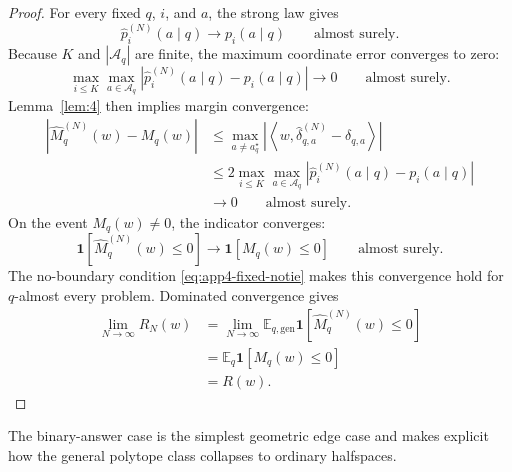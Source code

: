 \documentclass{article} %
\providecommand{\E}{\mathbb{E}}
\providecommand{\Aq}{\mathcal{A}_q}
\providecommand{\Risk}{R}
\providecommand{\Mhat}{\widehat{M}}
\begin{document}
\begin{proof}
For every fixed \(q\), \(i\), and \(a\), the strong law gives
\begin{equation}
\label{eq:app4-slln}
\widehat p_i^{(N)}(a\mid q)
\longrightarrow
p_i(a\mid q)
\qquad
\text{almost surely}.
\end{equation}
Because \(K\) and \(|\Aq|\) are finite, the maximum coordinate error converges to zero:
\begin{equation}
\label{eq:app4-max-error}
\max_{i\le K}
\max_{a\in\Aq}
\left|
\widehat p_i^{(N)}(a\mid q)
-
p_i(a\mid q)
\right|
\longrightarrow
0
\qquad
\text{almost surely}.
\end{equation}
Lemma~\ref{lem:4} then implies margin convergence:
\begin{align}
\left|
\Mhat_q^{(N)}(w)-M_q(w)
\right|
&\le
\max_{a\ne a_q^\star}
\left|
\left\langle
w,\widehat{\delta}_{q,a}^{(N)}-\delta_{q,a}
\right\rangle
\right|
\label{eq:app4-margin-conv-a}
\\
&\le
2
\max_{i\le K}
\max_{a\in\Aq}
\left|
\widehat p_i^{(N)}(a\mid q)
-
p_i(a\mid q)
\right|
\label{eq:app4-margin-conv-b}
\\
&\longrightarrow
0
\qquad
\text{almost surely}.
\label{eq:app4-margin-conv-c}
\end{align}
On the event \(M_q(w)\ne 0\), the indicator converges:
\begin{equation}
\label{eq:app4-indicator-conv}
\mathbf 1\!\left[
\Mhat_q^{(N)}(w)\le 0
\right]
\longrightarrow
\mathbf 1\!\left[
M_q(w)\le 0
\right]
\qquad
\text{almost surely}.
\end{equation}
The no-boundary condition \eqref{eq:app4-fixed-notie} makes this convergence hold for \(q\)-almost every problem.  Dominated convergence gives
\begin{align}
\lim_{N\to\infty}R_N(w)
&=
\lim_{N\to\infty}
\E_{q,\mathrm{gen}}
\mathbf 1\!\left[
\Mhat_q^{(N)}(w)\le 0
\right]
\label{eq:app4-dct-a}
\\
&=
\E_q
\mathbf 1\!\left[
M_q(w)\le 0
\right]
\label{eq:app4-dct-b}
\\
&=
\Risk(w).
\label{eq:app4-dct-c}
\end{align}
\end{proof}

The binary-answer case is the simplest geometric edge case and makes explicit how the general polytope class collapses to ordinary halfspaces.
\end{document}

